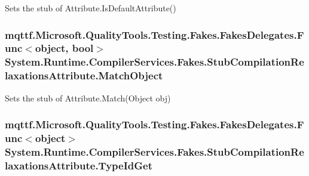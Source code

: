 Sets the stub of Attribute.\-Is\-Default\-Attribute()

\hypertarget{class_system_1_1_runtime_1_1_compiler_services_1_1_fakes_1_1_stub_compilation_relaxations_attribute_a4e5a8708a862c53eae10dc378fa7df82}{
\subsubsection[{Match\-Object}]{\setlength{\rightskip}{0pt plus 5cm}mqttf.\-Microsoft.\-Quality\-Tools.\-Testing.\-Fakes.\-Fakes\-Delegates.\-Func$<$object, bool$>$ System.\-Runtime.\-Compiler\-Services.\-Fakes.\-Stub\-Compilation\-Relaxations\-Attribute.\-Match\-Object}}\label{class_system_1_1_runtime_1_1_compiler_services_1_1_fakes_1_1_stub_compilation_relaxations_attribute_a4e5a8708a862c53eae10dc378fa7df82}


Sets the stub of Attribute.\-Match(\-Object obj)

\hypertarget{class_system_1_1_runtime_1_1_compiler_services_1_1_fakes_1_1_stub_compilation_relaxations_attribute_a862f7e49028ef626885e03abb1bb2bd8}{
\subsubsection[{Type\-Id\-Get}]{\setlength{\rightskip}{0pt plus 5cm}mqttf.\-Microsoft.\-Quality\-Tools.\-Testing.\-Fakes.\-Fakes\-Delegates.\-Func$<$object$>$ System.\-Runtime.\-Compiler\-Services.\-Fakes.\-Stub\-Compilation\-Relaxations\-Attribute.\-Type\-Id\-Get}}\label{class_system_1_1_runtime_1_1_compiler_services_1_1_fakes_1_1_stub_compilation_relaxations_attribute_a862f7e49028ef626885e03abb1bb2bd8}


